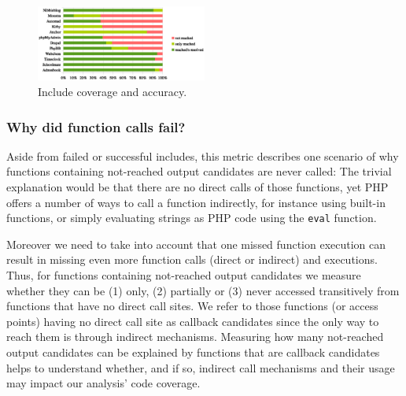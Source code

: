 \documentclass[preprint]{sig-alternate-05-2015}
\begin{document}
\begin{figure}
%				
%                

\includegraphics[width=0.5\textwidth]{images-paper/includes.eps}

    \label{fig:include_coverage_results}
    \caption{Include coverage and accuracy.}
\end{figure}

\subsubsection{Why did function calls fail?}
\label{WhyDidFunctionCallsFail}
Aside from failed or successful includes, this metric describes one scenario of why functions containing not-reached output candidates are never called: The trivial explanation would be that there are no direct calls of those functions, yet PHP offers a number of ways to call a function indirectly, for instance using built-in functions, or simply evaluating strings as PHP code using the \texttt{eval} function. 

Moreover we need to take into account that one missed function execution can result in missing even more function calls (direct or indirect) and executions. Thus, for functions containing not-reached output candidates we measure whether they can be (1) only, (2) partially or (3) never accessed transitively from functions that have no direct call sites. We refer to those functions (or access points) having no direct call site as callback candidates since the only way to reach them is through indirect mechanisms. Measuring how many not-reached output candidates can be explained by functions that are callback candidates helps to understand whether, and if so, indirect call mechanisms and their usage may impact our analysis’ code coverage.
\end{document}
